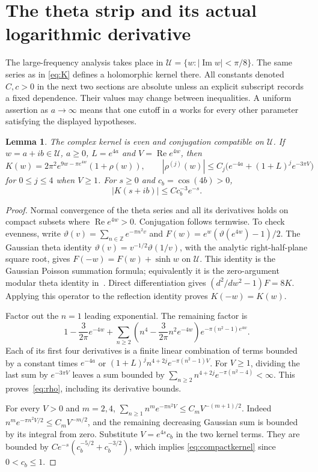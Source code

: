 \documentclass[11pt]{article}
\newtheorem{lemma}[theorem]{Lemma}
\theoremstyle{remark}\newtheorem{remark}[theorem]{Remark}
\DeclareMathOperator{\Rea}{Re}\DeclareMathOperator{\Ima}{Im}
\begin{document}
\section{The theta strip and its actual logarithmic derivative}
The large-frequency analysis takes place in
$\mathcal U=\{w:|\Ima w|<\pi/8\}$. The same series as in
\eqref{eq:K} defines a holomorphic kernel there. All constants
denoted $C,c>0$ in the next two sections are absolute unless
an explicit subscript records a fixed dependence. Their
values may change between inequalities. A uniform assertion
as $a\to\infty$ means that one cutoff in $a$ works for every
other parameter satisfying the displayed hypotheses.

\begin{lemma}\label{lem:strip}
The complex kernel is even and conjugation compatible on
$\mathcal U$. If $w=a+ib\in\mathcal U$, $a\geq0$, $L=e^{4a}$
and $V=\Rea e^{4w}$, then
\begin{equation}\label{eq:rho}
 K(w)=2\pi^2e^{9w-\pi e^{4w}}(1+\rho(w)),\qquad
 |\rho^{(j)}(w)|\leq C_j\bigl(e^{-4a}+(1+L)^je^{-3\pi V}\bigr)
\end{equation}
for $0\leq j\leq4$ when $V\geq1$.
For $s\geq0$ and $c_b=\cos(4b)>0$,
\begin{equation}\label{eq:compactkernel}
 |K(s+ib)|\leq Cc_b^{-3}e^{-s}.
\end{equation}
\end{lemma}
\begin{proof}
Normal convergence of the theta series and all its derivatives
holds on compact subsets where $\Rea e^{4w}>0$.
Conjugation follows termwise. To check evenness, write
$\vartheta(v)=\sum_{n\in\mathbb Z}e^{-\pi n^2v}$ and
$F(w)=e^w(\vartheta(e^{4w})-1)/2$. The Gaussian theta
identity $\vartheta(v)=v^{-1/2}\vartheta(1/v)$, with the
analytic right-half-plane square root, gives
$F(-w)=F(w)+\sinh w$ on $\mathcal U$.
This identity is the Gaussian Poisson summation formula;
equivalently it is the zero-argument modular theta identity
in~\cite{dlmf}. Direct differentiation gives
$(d^2/dw^2-1)F=8K$. Applying this operator to the reflection
identity proves $K(-w)=K(w)$.

Factor out the $n=1$ leading exponential. The remaining
factor is
\[
 1-\frac3{2\pi}e^{-4w}
 +\sum_{n\geq2}\left(n^4-\frac3{2\pi}n^2e^{-4w}\right)
                    e^{-\pi(n^2-1)e^{4w}}.
\]
Each of its first four derivatives is a finite linear
combination of terms bounded by a constant times
$e^{-4a}$ or
$(1+L)^j n^{4+2j}e^{-\pi(n^2-1)V}$.
For $V\geq1$, dividing the last sum by $e^{-3\pi V}$ leaves
a sum bounded by
$\sum_{n\geq2}n^{4+2j}e^{-\pi(n^2-4)}<\infty$.
This proves~\eqref{eq:rho}, including its derivative bounds.

For every $V>0$ and $m=2,4$,
$\sum_{n\geq1}n^me^{-\pi n^2V}\leq C_mV^{-(m+1)/2}$.
Indeed $n^me^{-\pi n^2V/2}\leq C_mV^{-m/2}$, and the
remaining decreasing Gaussian sum is bounded by its integral
from zero. Substitute $V=e^{4s}c_b$ in the two kernel terms.
They are bounded by
$Ce^{-s}(c_b^{-5/2}+c_b^{-3/2})$, which implies
\eqref{eq:compactkernel} since $0<c_b\leq1$.
\end{proof}
\end{document}
